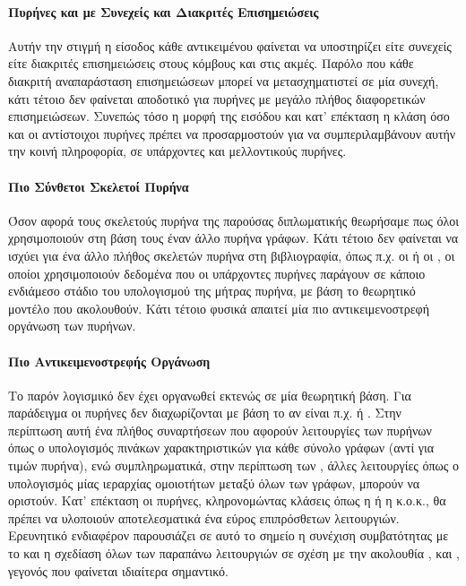 \paragraph*{Πυρήνες και με Συνεχείς και Διακριτές Επισημειώσεις}
Αυτήν την στιγμή η είσοδος κάθε αντικειμένου φαίνεται να υποστηρίζει είτε συνεχείς είτε διακριτές επισημειώσεις στους κόμβους και στις ακμές.
Παρόλο που κάθε διακριτή αναπαράσταση επισημειώσεων μπορεί να μετασχηματιστεί σε μία συνεχή, κάτι τέτοιο δεν φαίνεται αποδοτικό για πυρήνες με μεγάλο πλήθος διαφορετικών επισημειώσεων.
Συνεπώς τόσο η μορφή της εισόδου και κατ' επέκταση η κλάση  όσο και οι αντίστοιχοι πυρήνες πρέπει να προσαρμοστούν για να συμπεριλαμβάνουν αυτήν την κοινή πληροφορία, σε υπάρχοντες και μελλοντικούς πυρήνες.
\paragraph*{Πιο Σύνθετοι Σκελετοί Πυρήνα}
Όσον αφορά τους σκελετούς πυρήνα της παρούσας διπλωματικής θεωρήσαμε πως όλοι χρησιμοποιούν στη βάση τους έναν άλλο πυρήνα γράφων.
Κάτι τέτοιο δεν φαίνεται να ισχύει για ένα άλλο πλήθος σκελετών πυρήνα στη βιβλιογραφία, όπως π.χ. οι  \cite{DGK_PINAR} ή οι  \cite{kriege_2016_otk}, οι οποίοι χρησιμοποιούν δεδομένα που οι υπάρχοντες πυρήνες παράγουν σε κάποιο ενδιάμεσο στάδιο του υπολογισμού της μήτρας πυρήνα, με βάση το θεωρητικό μοντέλο που ακολουθούν.
Κάτι τέτοιο φυσικά απαιτεί μία πιο αντικειμενοστρεφή οργάνωση των πυρήνων.
\paragraph*{Πιο Αντικειμενοστρεφής Οργάνωση}
Το παρόν λογισμικό δεν έχει οργανωθεί εκτενώς σε μία θεωρητική βάση.
Για παράδειγμα οι πυρήνες δεν διαχωρίζονται με βάση το αν είναι π.χ.  \cite{vishwanathan2010graph} ή  \cite{Frohlich2005}.
Στην περίπτωση αυτή ένα πλήθος συναρτήσεων που αφορούν λειτουργίες των  πυρήνων όπως ο υπολογισμός πινάκων χαρακτηριστικών για κάθε σύνολο γράφων (αντί για τιμών πυρήνα), ενώ συμπληρωματικά, στην περίπτωση των , άλλες λειτουργίες όπως ο υπολογισμός μίας ιεραρχίας ομοιοτήτων μεταξύ όλων των γράφων, μπορούν να οριστούν.
Κατ' επέκταση οι πυρήνες, κληρονομώντας κλάσεις όπως η  ή η  κ.ο.κ., θα πρέπει να υλοποιούν αποτελεσματικά ένα εύρος επιπρόσθετων λειτουργιών.
Ερευνητικό ενδιαφέρον παρουσιάζει σε αυτό το σημείο η συνέχιση συμβατότητας με το  και η σχεδίαση όλων των παραπάνω λειτουργιών σε σχέση με την ακολουθία ,  και , γεγονός που φαίνεται ιδιαίτερα σημαντικό.
